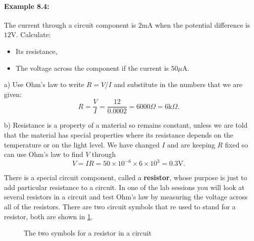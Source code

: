 \paragraph{Example 8.4:} The current through a circuit component is $2\text{mA}$ when the potential difference is $12\text{V}$. Calculate:
\begin{itemize}
\setlength{\itemsep}{-5pt}
    \item[a)] Its resistance,
    \item[b)] The voltage across the component if the current is $50\mu\text{A}$.
\end{itemize}

a) Use Ohm's law to write $R=V/I$ and substitute in the numbers that we are given:
\begin{equation*}
R=\frac{V}{I}=\frac{12}{0.0002}=6000\Omega = 6\text{k}\Omega.
\end{equation*}

b) Resistance is a property of a material so remains constant, unless we are told that the material has special properties where its resistance depends on the temperature or on the light level. We have changed $I$ and are keeping $R$ fixed so can use Ohm's law to find $V$ through
\begin{equation*}
V=IR=50\times10^{-6}\times 6\times 10^{3}=0.3\text{V}.
\end{equation*}


There is a special circuit component, called a \textbf{resistor}, whose purpose is just to add particular resistance to a circuit. In one of the lab sessions you will look at several resistors in a circuit and test Ohm's law by measuring the voltage across all of the resistors.  There are two circuit symbols that re used to stand for a resistor, both are shown in \cref{fig: resistors}.

\begin{figure}[ht]
    \centering
    \caption{The two symbols for a resistor in a circuit}
    \label{fig: resistors}
\end{figure}


